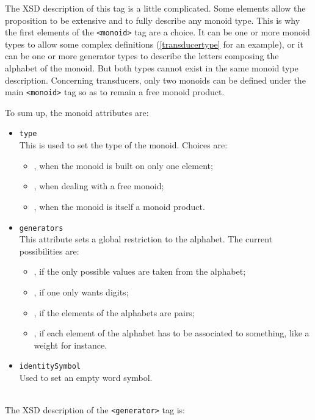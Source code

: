 \documentclass[a4paper]{article}
\newcommand{\xtag}[1]{\texttt{<#1>}}
\newcommand{\xattr}[1]{\texttt{#1}}
\begin{document}
The XSD description of this tag is a little complicated. Some elements
allow the proposition to be extensive and to fully describe any monoid
type. This is why the first elements of the \xtag{monoid} tag are a
choice. It can be one or more monoid types to allow some complex
definitions (\autoref{transducertype} for an example), or it can
be one or more generator types to describe the letters composing the
alphabet of the monoid. But both types cannot exist in the same monoid
type description. Concerning transducers, only two monoids can be
defined under the main \xtag{monoid} tag so as to remain a free monoid
product.

To sum up, the monoid attributes are:
\begin{itemize}
\item \xattr{type}\\
  This is used to set the type of the monoid. Choices are:
  \begin{itemize}
    \item {}, when the monoid is built on only one element;
    \item {}, when dealing with a free monoid;
    \item {}, when the monoid is itself a monoid product.
  \end{itemize}
\item \xattr{generators}\\
  This attribute sets a global restriction to the alphabet. The
  current possibilities are:
  \begin{itemize}
  \item {}, if the only possible values are taken from the
    alphabet;
  \item {}, if one only wants digits;
  \item {}, if the elements of the alphabets are pairs;
  \item {}, if each element of the alphabet has to be associated
    to something, like a weight for instance.
  \end{itemize}
\item \xattr{identitySymbol}\\
  Used to set an empty word symbol.
\end{itemize}
~\\
The XSD description of the \xtag{generator} tag is:
\end{document}
